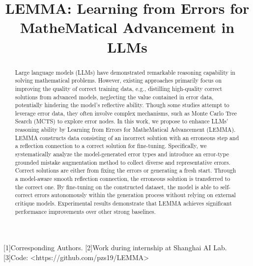 \documentclass[conference]{IEEEtran}
\title{LEMMA: Learning from Errors for MatheMatical Advancement in LLMs}
\author{\IEEEauthorblockN{Zhuoshi Pan , Yu Li , Honglin Lin , Qizhi Pei , Zinan Tang , Wei Wu , Chenlin Ming ,}
\IEEEauthorblockA{H. Vicky Zhao1, Conghui He2,*, Lijun Wu2,*}
}
\begin{document}
\maketitle

\begin{abstract}
Large language models (LLMs) have demonstrated remarkable reasoning capability in solving mathematical problems. However, existing approaches primarily focus on improving the quality of correct training data, e.g., distilling high-quality correct solutions from advanced models, neglecting the value contained in error data, potentially hindering the model's reflective ability. Though some studies attempt to leverage error data, they often involve complex mechanisms, such as Monte Carlo Tree Search (MCTS) to explore error nodes. In this work, we propose to enhance LLMs' reasoning ability by Learning from Errors for MatheMatical Advancement (LEMMA). LEMMA constructs data consisting of an incorrect solution with an erroneous step and a reflection connection to a correct solution for fine-tuning. Specifically, we systematically analyze the model-generated error types and introduce an error-type grounded mistake augmentation method to collect diverse and representative errors. Correct solutions are either from fixing the errors or generating a fresh start. Through a model-aware smooth reflection connection, the erroneous solution is transferred to the correct one. By fine-tuning on the constructed dataset, the model is able to self-correct errors autonomously within the generation process without relying on external critique models. Experimental results demonstrate that LEMMA achieves significant performance improvements over other strong baselines.
\end{abstract}


[1]Corresponding Authors. [2]Work during internship at Shanghai AI Lab. [3]Code: <https://github.com/pzs19/LEMMA>
\end{document}
